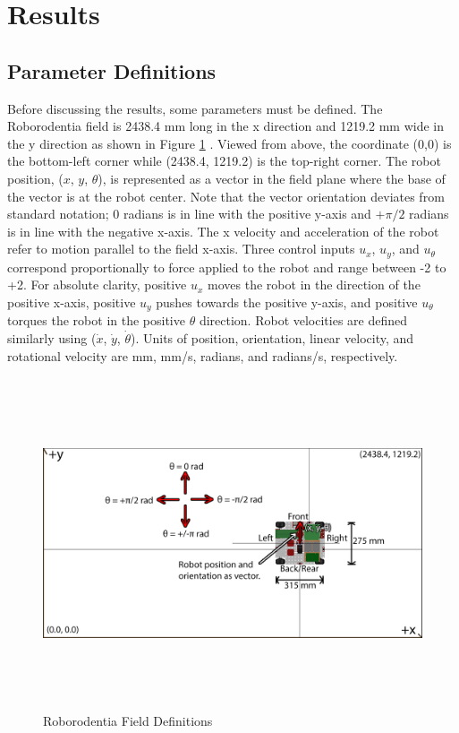 \section{Results}
\subsection{Parameter Definitions}
Before discussing the results, some parameters must be defined. The Roborodentia field is 2438.4 mm long in the x direction and 1219.2 mm wide in the y direction as shown in Figure \ref{fig:field_defs} \cite{roborodentia}. Viewed from above, the coordinate (0,0) is the bottom-left corner while (2438.4, 1219.2) is the top-right corner. The robot position, ($x$, $y$, $\theta$), is represented as a vector in the field plane where the base of the vector is at the robot center. Note that the vector orientation deviates from standard notation; 0 radians is in line with the positive y-axis and $+\pi/2$ radians is in line with the negative x-axis. The x velocity and acceleration of the robot refer to motion parallel to the field x-axis. Three control inputs $u_x$, $u_y$, and $u_\theta$ correspond proportionally to force applied to the robot and range between -2 to +2. For absolute clarity, positive $u_x$ moves the robot in the direction of the positive x-axis, positive $u_y$ pushes towards the positive y-axis, and positive $u_\theta$ torques the robot in the positive $\theta$ direction. Robot velocities are defined similarly using ($\dot{x}$, $\dot{y}$, $\dot{\theta}$). Units of position, orientation, linear velocity, and rotational velocity are mm, mm/s, radians, and radians/s, respectively.
\begin{figure}[H]
	\includegraphics[width=6in, height=3.85in, keepaspectratio]{figures/field_defs.png}
	\caption{Roborodentia Field Definitions} \label{fig:field_defs}
\end{figure}

